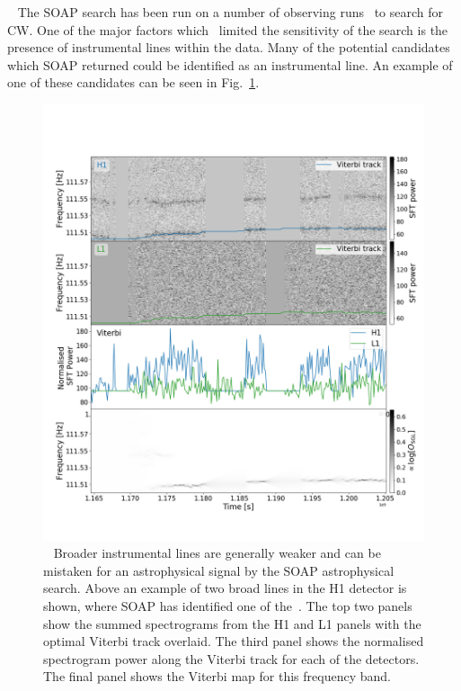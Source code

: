 % 
~ The SOAP search has been run on a number of observing runs~
to search for \gls{CW}.  One of the major factors which~ limited the sensitivity
of the search is the presence of instrumental lines within the data.  Many of
the potential candidates which SOAP returned could be identified as an
instrumental line. An example of one of these candidates can be seen in
Fig.~\ref{detchar:soap:astrowander}.
%
\begin{figure}[h]
	\includegraphics[width=\textwidth]{C5_detchar/plot_F111_5_wandering_line.png}
        \caption[Broad wandering line example.]{~ Broader
instrumental lines are generally weaker and can be mistaken for an
astrophysical signal by the SOAP astrophysical search. Above an example of two
broad lines in the H1 detector is shown, where SOAP has identified one of
the~.
The top two panels show the summed spectrograms from the H1 and L1 panels with
the optimal Viterbi track overlaid. The third panel shows the normalised
spectrogram power along the Viterbi track for each of the detectors. The final
panel shows the Viterbi map for this frequency band.~}
\label{detchar:soap:astrowander}

\end{figure}
